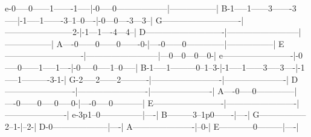 \begin{lsttab}
e-0-----0------1-------1-----|-0-----0------------------|-----------------|
B-1-----1------3-------3-----|-1-----1-------3--1--0----|-0---0----3---3--|
G----------------------------|------------------------2-|-1---1----4---4--|
D----------------------------|--------------------------|-----------------|
A----0------0------0-------0-|----0------0--------------|-----------------|
E----------------------------|--------------------------|---0---0---0---0-|
e-------------------------|-0-----0------1-----1----|-0-----0-----1--0-----|
B-1-----1---------0--1--3-|-1-----1------3-----3----|-1-----1----------3-1-|
G-2-----2------2----------|-------------------------|----------------------|
D-------------------------|-------------------------|----------------------|
A----0-----0--------------|----0------0-----0-----0-|----0-----0-----------|
E-------------------------|-------------------------|----------------------|
e-3p1--0---------------|----|
B---------3--1p0-------|----|
G-----------------2--1-|--2-|
D-0--------------------|----|
A----------------------|--0-|
E------------0---------|----|
\end{lsttab}


